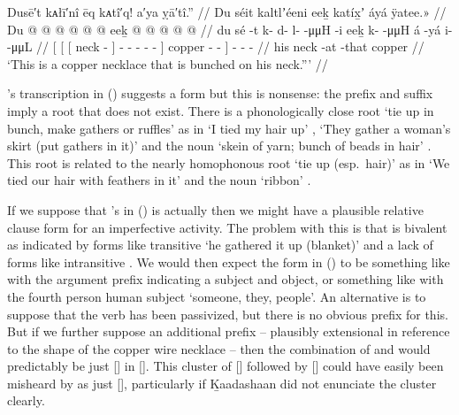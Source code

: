 \ex\label{ex:100-136-copper-necklace-on-neck}%
%
\begingl
	\glpreamble	Dusē′t kᴀłī′nî ēq kᴀtî′q! a′ya ỵā′tî.” //
	\glpreamble	Du séit kaltlʼéeni eeḵ katíx̱ʼ áyá ÿatee.\!» //
	\gla	{} {} {} Du  @ {} {} 
				 @ {} @ {} @ {} @ {} @ {} {}
			eeḵ  @ {} @ {} {}
		 @ {}
		 @ {} @ {} //
	\glb	{} {} {} du sé -t {} 
			k- d- l-  -μμH -i {}
			eeḵ k-  -μμH {}
		á -yá 
		i-  -μμL //
	\glc	{}[ {}[ {}[  neck - {}]
			- - -  - - {}]
			copper -  - {}]
		 -
		-  - //
	\gld	{} {} {} his neck -at {} 
			 {} {} {} {} -that {}
			copper  {} {} {}
		 {}
		 {} {} //
	\glft	‘This is a copper necklace that is bunched on his neck.”’
		//
\endgl
\xe

\citeauthor{swanton:1909}’s transcription  in (\lastx) suggests a form  but this is nonsense: the prefix  and suffix  imply a root  that does not exist.
There is a phonologically close root  ‘tie up in bunch, make gathers or ruffles’ as in  ‘I tied my hair up’ \parencite[229]{story-naish:1973},  ‘They gather a woman’s skirt (put gathers in it)’ \parencite[99]{story-naish:1973} and the noun  ‘skein of yarn; bunch of beads in hair’ \parencite[08/243]{leer:1973}.
This root  is related to the nearly homophonous root  ‘tie up (esp.\ hair)’ as in  ‘We tied our hair with feathers in it’ \parencite[230]{story-naish:1973} and the noun  ‘ribbon’ \parencite[10/252]{leer:1973}.

If we suppose that \citeauthor{swanton:1909}’s  in (\lastx) is actually  then we might have a plausible relative clause form for an imperfective activity.
The problem with this is that  is bivalent as indicated by forms like transitive  ‘he gathered it up (blanket)’ \parencite[08/243]{leer:1973} and a lack of forms like intransitive .
We would then expect the form in (\lastx) to be something like  with the argument prefix  indicating a subject and object, or something like  with the fourth person human subject  ‘someone, they, people’.
An alternative is to suppose that the verb has been passivized, but there is no obvious  prefix for this.
But if we further suppose an additional  prefix – plausibly extensional in reference to the shape of the copper wire necklace – then the combination of  and  would predictably be just  [] in  [].
This cluster of [] followed by [] could have easily been misheard by \citeauthor{swanton:1909} as just [], particularly if Ḵaadashaan did not enunciate the cluster clearly.

